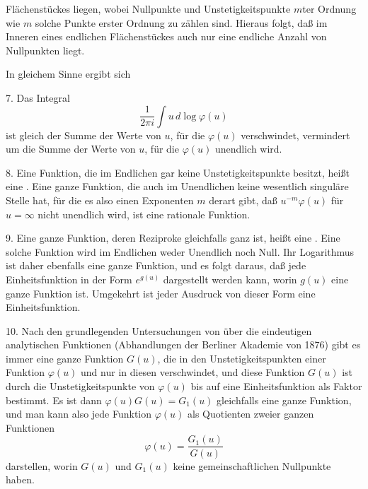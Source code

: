 
Flächenstückes liegen, wobei Nullpunkte und Unstetigkeitspunkte $m$ter Ordnung wie $m$ solche Punkte erster Ordnung zu zählen sind.
Hieraus folgt, daß im Inneren eines endlichen Flächenstückes auch nur eine endliche Anzahl von Nullpunkten liegt.

In gleichem Sinne ergibt sich

7. Das Integral
\[
\frac{1}{2\pi i}\int u\,d\log\varphi(u)
\]
ist gleich der Summe der Werte von $u$, für die $\varphi(u)$ verschwindet, vermindert um die Summe der Werte von $u$, für die $\varphi(u)$ unendlich wird.

8. Eine Funktion, die im Endlichen gar keine Unstetigkeitspunkte besitzt, heißt eine .  Eine ganze Funktion, die auch im Unendlichen keine wesentlich singuläre Stelle hat, für die es also einen Exponenten $m$ derart gibt, daß $u^{-m}\varphi(u)$ für $u = \infty$ nicht unendlich wird, ist eine rationale Funktion.

9. Eine ganze Funktion, deren Reziproke gleichfalls ganz ist, heißt eine . Eine solche Funktion wird im Endlichen weder Unendlich noch Null. Ihr Logarithmus ist daher ebenfalls eine ganze Funktion, und es folgt daraus, daß jede Einheitsfunktion in der Form $e^{g(u)}$ dargestellt werden kann, worin $g(u)$ eine ganze Funktion ist. Umgekehrt ist jeder Ausdruck von dieser Form eine Einheitsfunktion.

10. Nach den grundlegenden Untersuchungen von  über die eindeutigen analytischen Funktionen (Abhandlungen der Berliner Akademie von 1876) gibt es immer eine ganze Funktion $G(u)$, die in den Unstetigkeitspunkten einer Funktion $\varphi(u)$ und nur in diesen verschwindet, und diese Funktion $G(u)$ ist durch die Unstetigkeitspunkte von $\varphi(u)$ bis auf eine Einheitsfunktion als Faktor bestimmt. Es ist dann $\varphi(u)G(u) = G_1(u)$ gleichfalls eine ganze Funktion, und man kann also jede Funktion $\varphi(u)$ als Quotienten zweier ganzen Funktionen
\[
\varphi(u) = \frac{G_1(u)}{G(u)}
\]
darstellen, worin $G(u)$ und $G_1(u)$ keine gemeinschaftlichen Nullpunkte haben.
